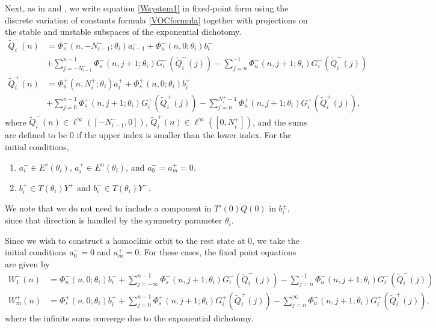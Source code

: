 \documentclass[12pt]{elsarticle}
\begin{document}
Next, as in \cite{Sandstede1997} and \cite{Knobloch2000}, we write equation \cref{Wsystem1} in fixed-point form using the discrete variation of constants formula \cref{VOCformula} together with projections on the stable and unstable subspaces of the exponential dichotomy.
\begin{equation}\label{FPeqs1}
\begin{aligned}
\tilde{Q}_i^-(n) &= 
\Phi_s^-(n, -N_{i-1}^-; \theta_i) a_{i-1}^- + \Phi_u^-(n, 0; \theta_i) b_i^-  \\
&+ \sum_{j = -N_{i-1}^-}^{n-1} \Phi_s^-(n, j+1; \theta_i) G_i^-(\tilde{Q}_i^-(j)) - \sum_{j = n}^{-1} \Phi_u^-(n, j+1; \theta_i) G_i^-(\tilde{Q}_i^-(j)) \\
\tilde{Q}_i^+(n) &= \Phi_u^+(n, N_i^+; \theta_i) a_i^+ + \Phi_s^+(n, 0; \theta_i) b_i^+ \\
&+ \sum_{j = 0}^{n-1} \Phi_s^+(n, j+1; \theta_i) G_i^+(\tilde{Q}_i^+(j)) 
- \sum_{j = n}^{N_i^+-1} \Phi_u^+(n, j+1; \theta_i) G_i^+(\tilde{Q}_i^+(j)),
\end{aligned}
\end{equation}
where $\tilde{Q}_i^-(n) \in \ell^\infty([-N_{i-1}^-, 0])$, $\tilde{Q}_i^+(n) \in \ell^\infty([0, N_i^+])$, and the sums are defined to be $0$ if the upper index is smaller than the lower index. For the initial conditions, 
\begin{enumerate}
\item $a_i^- \in E^s(\theta_i)$, $a_i^+ \in E^u(\theta_i)$, and $a_0^- = a_m^+ = 0$.
\item $b_i^+ \in T(\theta_i) Y^+$ and $b_i^- \in T(\theta_i) Y^-$.
\end{enumerate}
We note that we do not need to include a component in $T'(0) Q(0)$ in $b_i^\pm$, since that direction is handled by the symmetry parameter $\theta_i$.

Since we wish to construct a homoclinic orbit to the rest state at 0, we take the initial conditions $a_0^- = 0$ and $a_m^+ = 0$. For these cases, the fixed point equations are given by
\begin{align*}
W_1^-(n) &= \Phi_u^-(n, 0; \theta_i) b_i^- 
+ \sum_{j = -\infty}^{n-1} \Phi_s^-(n, j+1; \theta_i) G_i^-(\tilde{Q}_i^-(j)) - \sum_{j = n}^{-1} \Phi_u^-(n, j+1; \theta_i) G_i^-(\tilde{Q}_i^-(j)) \\
W_m^+(n) &= \Phi_s^+(n, 0; \theta_i) b_i^+ 
+ \sum_{j = 0}^{n-1} \Phi_s^+(n, j+1; \theta_i) G_i^+(\tilde{Q}_i^+(j)) 
- \sum_{j = n}^\infty \Phi_u^+(n, j+1; \theta_i) G_i^+(\tilde{Q}_i^+(j)),
\end{align*}
where the infinite sums converge due to the exponential dichotomy. 
\end{document}
